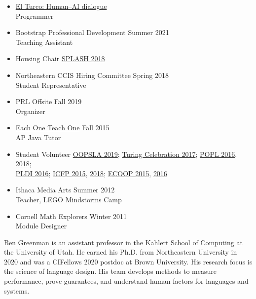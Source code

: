 \documentclass[11pt]{article}
\begin{document}
\begin{itemize}
  \item \href{https://elturco.diemutstrebe.com}{El Turco: Human--AI dialogue} \hfill {} \\
    Programmer
  \item {Bootstrap Professional Development} \hfill {Summer 2021}\\
        Teaching Assistant
  \item {Housing Chair} \hfill \href{https://2018.splashcon.org/committee/splash-2018-organizing-committee}{SPLASH 2018}
  \item {Northeastern CCIS Hiring Committee} \hfill {Spring 2018}\\
    Student Representative
  \item {PRL Offsite} \hfill {Fall 2019}\\
    Organizer
  \item \href{https://www.eachoneteachone.is}{Each One Teach One} \hfill {Fall 2015}\\
    AP Java Tutor
  \item {Student Volunteer} \hfill \href{https://2019.splashcon.org/}{OOPSLA 2019}; \href{https://www.acm.org/turing-award-50/conference}{Turing Celebration 2017}; \href{http://conf.researchr.org/home/POPL-2016}{POPL 2016}, \href{http://conf.researchr.org/home/POPL-2018}{2018};\\
    {\hbox{}\hfill{} \href{http://conf.researchr.org/home/PLDI-2016}{PLDI 2016}; \href{http://icfpconference.org/icfp2015/}{ICFP 2015}, \href{https://icfp18.sigplan.org/committee/icfp-2018-organizing-committee}{2018}; \href{http://2015.ecoop.org/}{ECOOP 2015}, \href{http://2016.ecoop.org/}{2016}}
  \item {Ithaca Media Arts} \hfill {Summer 2012}\\
    Teacher, LEGO Mindstorms Camp
  \item {Cornell Math Explorers} \hfill {Winter 2011}\\
    Module Designer

\end{itemize}



Ben Greenman is an assistant professor in the Kahlert School of Computing at
the University of Utah. He earned his Ph.D. from Northeastern University in
2020 and was a CIFellows 2020 postdoc at Brown University. His research focus
is the science of language design. His team develops methods to measure
performance, prove guarantees, and understand human factors for languages and
systems.
\end{document}
